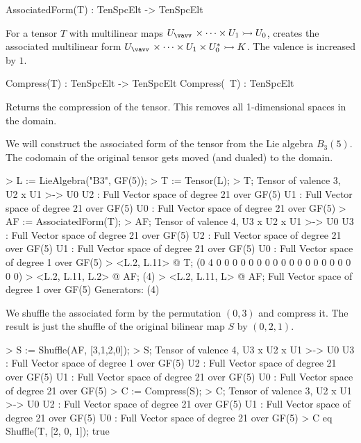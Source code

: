 \begin{intrinsics}
AssociatedForm(T) : TenSpcElt -> TenSpcElt
\end{intrinsics}

For a tensor $T$ with multilinear maps $U_{\vav}\times \cdots \times U_1\rightarrowtail U_0$,
creates the associated multilinear form
$U_{\vav}\times\cdots\times U_1\times U_0^*\rightarrowtail K$. 
The valence is increased by $1$.

\begin{intrinsics}
Compress(T) : TenSpcElt -> TenSpcElt
Compress(~T) : TenSpcElt
\end{intrinsics}

Returns the compression of the tensor. This removes all 1-dimensional spaces in the domain.

\begin{example}[CompressAssocForm]

We will construct the associated form of the tensor from the Lie algebra $B_3(5)$. 
The codomain of the original tensor gets moved (and dualed) to the domain. 
\begin{code}
> L := LieAlgebra("B3", GF(5));
> T := Tensor(L); 
> T;
Tensor of valence 3, U2 x U1 >-> U0
U2 : Full Vector space of degree 21 over GF(5)
U1 : Full Vector space of degree 21 over GF(5)
U0 : Full Vector space of degree 21 over GF(5)
> AF := AssociatedForm(T);
> AF;
Tensor of valence 4, U3 x U2 x U1 >-> U0
U3 : Full Vector space of degree 21 over GF(5)
U2 : Full Vector space of degree 21 over GF(5)
U1 : Full Vector space of degree 21 over GF(5)
U0 : Full Vector space of degree 1 over GF(5)
> <L.2, L.11> @ T;
(0 4 0 0 0 0 0 0 0 0 0 0 0 0 0 0 0 0 0 0 0)
> <L.2, L.11, L.2> @ AF;
(4)
> <L.2, L.11, L> @ AF;
Full Vector space of degree 1 over GF(5)
Generators:
(4)
\end{code}

We shuffle the associated form by the permutation $(0,3)$ and compress it.
The result is just the shuffle of the original bilinear map $S$ by $(0,2,1)$.

\begin{code}
> S := Shuffle(AF, [3,1,2,0]);
> S;
Tensor of valence 4, U3 x U2 x U1 >-> U0
U3 : Full Vector space of degree 1 over GF(5)
U2 : Full Vector space of degree 21 over GF(5)
U1 : Full Vector space of degree 21 over GF(5)
U0 : Full Vector space of degree 21 over GF(5)
> C := Compress(S);
> C;
Tensor of valence 3, U2 x U1 >-> U0
U2 : Full Vector space of degree 21 over GF(5)
U1 : Full Vector space of degree 21 over GF(5)
U0 : Full Vector space of degree 21 over GF(5)
> C eq Shuffle(T, [2, 0, 1]);
true
\end{code}
\end{example}

